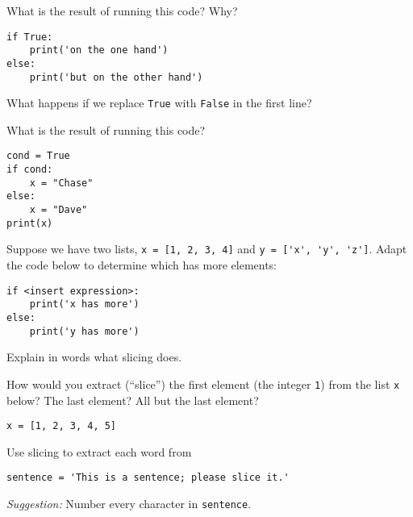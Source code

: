\documentclass[11pt]{exam}
\begin{document}
\begin{questions}
\item What is the result of running this code?  Why?
\begin{verbatim}
if True:
    print('on the one hand')
else:
    print('but on the other hand')
\end{verbatim}
What happens if we replace {\tt True} with {\tt False} in the first line?

\item What is the result of running this code?
\begin{verbatim}
cond = True
if cond:
    x = "Chase"
else:
    x = "Dave"
print(x)
\end{verbatim}

\item Suppose we have two lists,
{\tt x = [1, 2, 3, 4]} and \verb|y = ['x', 'y', 'z']|.
Adapt the code below to determine which has more elements:
\begin{verbatim}
if <insert expression>:
    print('x has more')
else:
    print('y has more')
\end{verbatim}



\item Explain in words what slicing does.

\item How would you extract (``slice'') the first element (the integer {\tt 1}) from the list {\tt x} below?
The last element?  All but the last element?
\begin{verbatim}
x = [1, 2, 3, 4, 5]
\end{verbatim}

\item Use slicing to extract each word from
\begin{verbatim}
sentence = 'This is a sentence; please slice it.'
\end{verbatim}
{\it Suggestion:\/} Number every character in {\tt sentence}.



\end{questions}
\end{document}
